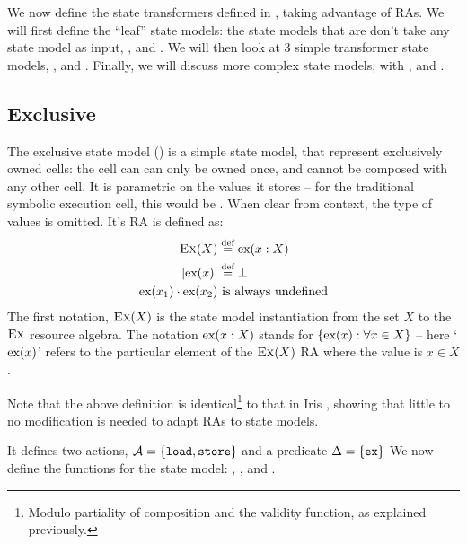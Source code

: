 We now define the state transformers defined in \cite{sacha-phd}, taking advantage of RAs. We will first define the ``leaf'' state models: the state models that are don't take any state model as input, \Ex, \Ag{} and \Frac. We will then look at 3 simple transformer state models, \Sum, \Product{} and \PProduct{}. Finally, we will discuss more complex state models, with \Freeable, \PMap{} and \List.

\subsection{Exclusive}

The exclusive state model \Ex{}(\Val) is a simple state model, that represent exclusively owned cells: the cell can can only be owned once, and cannot be composed with any other cell. It is parametric on the values it stores -- for the traditional symbolic execution cell, this would be . When clear from context, the type of values is omitted. It's RA is defined as: \begin{align*}
 	\textsc{Ex}(X) &\stackrel{\textnormal{def}}=	\text{ex}(x: X)\\
 	|\text{ex}(x)| &\stackrel{\textnormal{def}}= \bot\\
 	\text{ex}(x_1) \cdot \text{ex}(x_2)&~\text{is always undefined}
 \end{align*}
The first notation, $\textsc{Ex}(X)$ is the state model instantiation from the set $X$ to the $\textsc{Ex}$ resource algebra. The notation $\text{ex}(x:X)$ stands for $\{\text{ex}(x) : \forall x\in X \}$ -- here `$\text{ex}(x)$' refers to the particular element of the $\textsc{Ex}(X)$ RA where the value is $x\in X$.

 Note that the above definition is identical\footnote{Modulo partiality of composition and the validity function, as explained previously.} to that in Iris \cite{iris}, showing that little to no modification is needed to adapt RAs to state models.

It defines two actions, ${\cal{A}}=\{\texttt{load}, \texttt{store}\}$ and a predicate $\Delta=\{\texttt{ex}\}$  We now define the functions for the state model: \execac, \produce, \consume{} and \fix.

